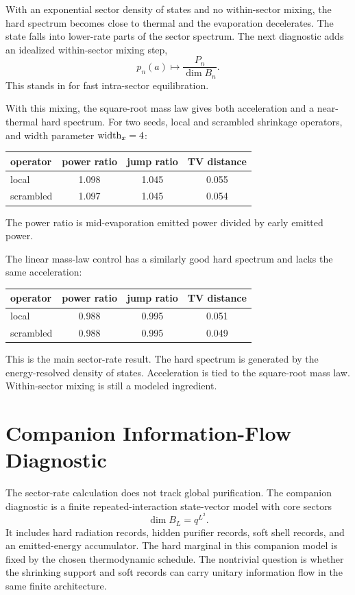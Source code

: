 \documentclass[aps,prd,onecolumn,longbibliography,nofootinbib]{revtex4-2}
\begin{document}
With an exponential sector density of states and no within-sector mixing, the
hard spectrum becomes close to thermal and the evaporation decelerates.  The
state falls into lower-rate parts of the sector spectrum.  The next diagnostic
adds an idealized within-sector mixing step,
\begin{equation}
    p_n(a)\mapsto \frac{P_n}{\dim B_n}.
\end{equation}
This stands in for fast intra-sector equilibration.

With this mixing, the square-root mass law gives both acceleration and a
near-thermal hard spectrum.  For two seeds, local and scrambled shrinkage
operators, and width parameter ${\rm width}_x=4$:
\begin{center}
\begin{tabular}{lccc}
\toprule
operator & power ratio & jump ratio & TV distance\\
\midrule
local     & 1.098 & 1.045 & 0.055\\
scrambled & 1.097 & 1.045 & 0.054\\
\bottomrule
\end{tabular}
\end{center}
The power ratio is mid-evaporation emitted power divided by early emitted
power.

The linear mass-law control has a similarly good hard spectrum and lacks the
same acceleration:
\begin{center}
\begin{tabular}{lccc}
\toprule
operator & power ratio & jump ratio & TV distance\\
\midrule
local     & 0.988 & 0.995 & 0.051\\
scrambled & 0.988 & 0.995 & 0.049\\
\bottomrule
\end{tabular}
\end{center}

This is the main sector-rate result.  The hard spectrum is generated by the
energy-resolved density of states.  Acceleration is tied to the square-root
mass law.  Within-sector mixing is still a modeled ingredient.

\section{Companion Information-Flow Diagnostic}
\label{sec:info}

The sector-rate calculation does not track global purification.  The companion
diagnostic is a finite repeated-interaction state-vector model with core
sectors
\begin{equation}
    \dim B_L=q^{L^2}.
\end{equation}
It includes hard radiation records, hidden purifier records, soft shell
records, and an emitted-energy accumulator.  The hard marginal in this
companion model is fixed by the chosen thermodynamic schedule.  The
nontrivial question is whether the shrinking support and soft records can
carry unitary information flow in the same finite architecture.
\end{document}
